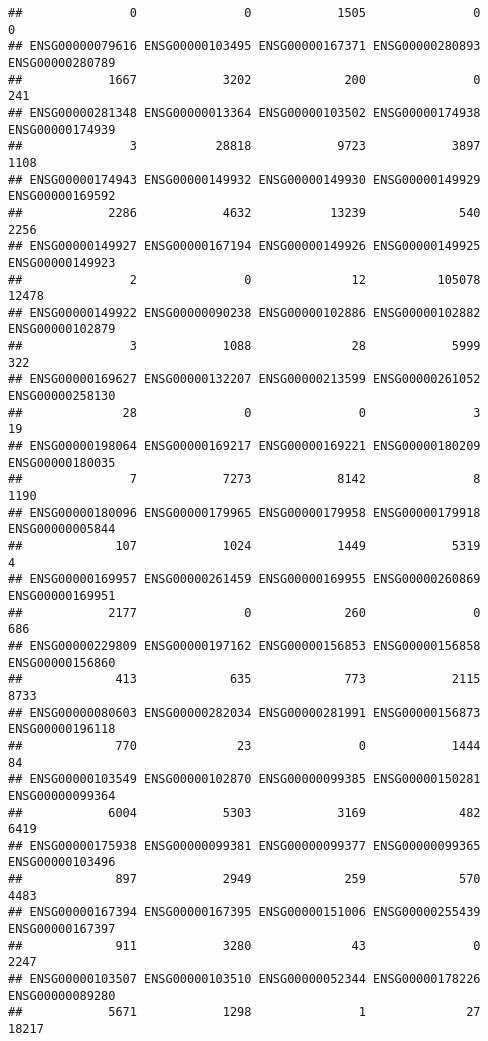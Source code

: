 \documentclass[
]{article}
\begin{document}
\begin{verbatim}
##               0               0            1505               0               0 
## ENSG00000079616 ENSG00000103495 ENSG00000167371 ENSG00000280893 ENSG00000280789 
##            1667            3202             200               0             241 
## ENSG00000281348 ENSG00000013364 ENSG00000103502 ENSG00000174938 ENSG00000174939 
##               3           28818            9723            3897            1108 
## ENSG00000174943 ENSG00000149932 ENSG00000149930 ENSG00000149929 ENSG00000169592 
##            2286            4632           13239             540            2256 
## ENSG00000149927 ENSG00000167194 ENSG00000149926 ENSG00000149925 ENSG00000149923 
##               2               0              12          105078           12478 
## ENSG00000149922 ENSG00000090238 ENSG00000102886 ENSG00000102882 ENSG00000102879 
##               3            1088              28            5999             322 
## ENSG00000169627 ENSG00000132207 ENSG00000213599 ENSG00000261052 ENSG00000258130 
##              28               0               0               3              19 
## ENSG00000198064 ENSG00000169217 ENSG00000169221 ENSG00000180209 ENSG00000180035 
##               7            7273            8142               8            1190 
## ENSG00000180096 ENSG00000179965 ENSG00000179958 ENSG00000179918 ENSG00000005844 
##             107            1024            1449            5319               4 
## ENSG00000169957 ENSG00000261459 ENSG00000169955 ENSG00000260869 ENSG00000169951 
##            2177               0             260               0             686 
## ENSG00000229809 ENSG00000197162 ENSG00000156853 ENSG00000156858 ENSG00000156860 
##             413             635             773            2115            8733 
## ENSG00000080603 ENSG00000282034 ENSG00000281991 ENSG00000156873 ENSG00000196118 
##             770              23               0            1444              84 
## ENSG00000103549 ENSG00000102870 ENSG00000099385 ENSG00000150281 ENSG00000099364 
##            6004            5303            3169             482            6419 
## ENSG00000175938 ENSG00000099381 ENSG00000099377 ENSG00000099365 ENSG00000103496 
##             897            2949             259             570            4483 
## ENSG00000167394 ENSG00000167395 ENSG00000151006 ENSG00000255439 ENSG00000167397 
##             911            3280              43               0            2247 
## ENSG00000103507 ENSG00000103510 ENSG00000052344 ENSG00000178226 ENSG00000089280 
##            5671            1298               1              27           18217 

\end{verbatim}
\end{document}
